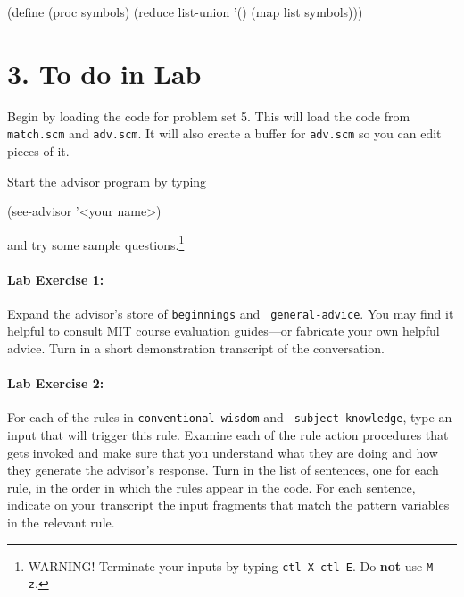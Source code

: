 \beginlisp
(define (proc symbols)
  (reduce list-union
          '()
          (map list symbols)))
\endlisp

\section{3. To do in Lab}

Begin by loading the code for problem set 5.  This will load the code
from {\tt match.scm} and {\tt adv.scm}.  It will also create a buffer
for {\tt adv.scm} so you can edit pieces of it.

Start the advisor program by typing

\beginlisp
(see-advisor '<your name>)
\endlisp

\noindent and try some sample questions.\footnote{WARNING!  Terminate
your inputs by typing {\tt ctl-X ctl-E}.  Do {\bf not} use {\tt M-z}.}


\paragraph{Lab Exercise 1:}
Expand the advisor's store of {\tt beginnings} and {\tt
general-advice}.  You may find it helpful to consult MIT course
evaluation guides---or fabricate your own helpful advice.  Turn in a
short demonstration transcript of the conversation.

\paragraph{Lab Exercise 2:}
For each of the rules in {\tt conventional-wisdom} and {\tt
subject-knowledge}, type an input that will trigger this rule.
Examine each of the rule action procedures that gets invoked and make
sure that you understand what they are doing and how they generate the
advisor's response.  Turn in the list of sentences, one for each rule,
in the order in which the rules appear in the code.  For each sentence,
indicate on your transcript the input fragments that match the pattern
variables in the relevant rule.

